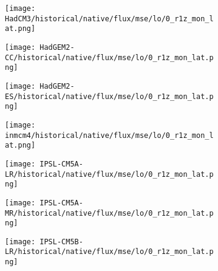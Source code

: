 \documentclass[preview]{standalone}
\begin{document}
\begin{figure}
  \begin{subfigure}[t]{\textwidth}
    \texttt{[image: HadCM3/historical/native/flux/mse/lo/0\_r1z\_mon\_lat.png]}
  \end{subfigure}
\end{figure}

\begin{figure}
  \begin{subfigure}[t]{\textwidth}
    \texttt{[image: HadGEM2-CC/historical/native/flux/mse/lo/0\_r1z\_mon\_lat.png]}
  \end{subfigure}
\end{figure}

\begin{figure}
  \begin{subfigure}[t]{\textwidth}
    \texttt{[image: HadGEM2-ES/historical/native/flux/mse/lo/0\_r1z\_mon\_lat.png]}
  \end{subfigure}
\end{figure}

\begin{figure}
  \begin{subfigure}[t]{\textwidth}
    \texttt{[image: inmcm4/historical/native/flux/mse/lo/0\_r1z\_mon\_lat.png]}
  \end{subfigure}
\end{figure}

\begin{figure}
  \begin{subfigure}[t]{\textwidth}
    \texttt{[image: IPSL-CM5A-LR/historical/native/flux/mse/lo/0\_r1z\_mon\_lat.png]}
  \end{subfigure}
\end{figure}

\begin{figure}
  \begin{subfigure}[t]{\textwidth}
    \texttt{[image: IPSL-CM5A-MR/historical/native/flux/mse/lo/0\_r1z\_mon\_lat.png]}
  \end{subfigure}
\end{figure}

\begin{figure}
  \begin{subfigure}[t]{\textwidth}
    \texttt{[image: IPSL-CM5B-LR/historical/native/flux/mse/lo/0\_r1z\_mon\_lat.png]}
  \end{subfigure}
\end{figure}
\end{document}

